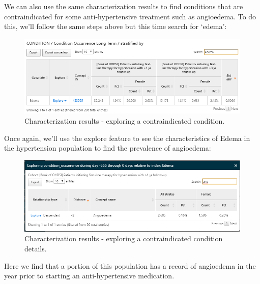 \documentclass[11pt]{book}
\theoremstyle{definition}
\theoremstyle{definition}
\theoremstyle{definition}
\theoremstyle{remark}
\begin{document}
We can also use the same characterization results to find conditions that are contraindicated for some anti-hypertensive treatment such as angioedema. To do this, we'll follow the same steps above but this time search for `edema':

\begin{figure}

{\centering \includegraphics[width=1\linewidth]{images/Characterization/atlasCharacterizationResultsContra} 

}

\caption{Characterization results - exploring a contraindicated condition.}\label{fig:atlasCharacterizationResultsContra}
\end{figure}

Once again, we'll use the explore feature to see the characteristics of Edema in the hypertension population to find the prevalence of angioedema:

\begin{figure}

{\centering \includegraphics[width=1\linewidth]{images/Characterization/atlasCharacterizationResultsContraExplore} 

}

\caption{Characterization results - exploring a contraindicated condition details.}\label{fig:atlasCharacterizationResultsContraExplore}
\end{figure}

Here we find that a portion of this population has a record of angioedema in the year prior to starting an anti-hypertensive medication.
\end{document}
